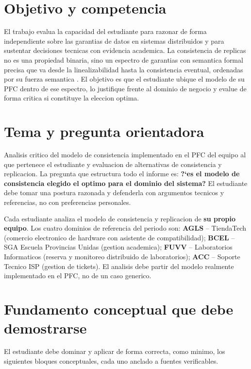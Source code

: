 \documentclass[11pt,a4paper]{article}
\newcommand{\uteqbox}[2]{%
    \begin{tcolorbox}[colback=uteqSoft,colframe=uteqBlue,boxrule=0.8pt,arc=2pt,left=6pt,right=6pt,top=5pt,bottom=5pt,title=#1,fonttitle=\bfseries]
        #2
    \end{tcolorbox}%
}
\begin{document}
\section{Objetivo y competencia}
El trabajo evalua la capacidad del estudiante para razonar de forma independiente sobre las garantias de datos en sistemas distribuidos y para sustentar decisiones tecnicas con evidencia academica. La consistencia de replicas no es una propiedad binaria, sino un espectro de garantias con semantica formal precisa que va desde la linealizabilidad hasta la consistencia eventual, ordenadas por su fuerza semantica \parencite{ViottiVukolic2016Consistency}. El objetivo es que el estudiante ubique el modelo de su PFC dentro de ese espectro, lo justifique frente al dominio de negocio y evalue de forma critica si constituye la eleccion optima.

\section{Tema y pregunta orientadora}
Analisis critico del modelo de consistencia implementado en el PFC del equipo al que pertenece el estudiante y evaluacion de alternativas de consistencia y replicacion. La pregunta que estructura todo el informe es: \textbf{?`es el modelo de consistencia elegido el optimo para el dominio del sistema?} El estudiante debe tomar una postura razonada y defenderla con argumentos tecnicos y referencias, no con preferencias personales.

\uteqbox{Objeto de analisis segun el equipo PFC}{%
Cada estudiante analiza el modelo de consistencia y replicacion de \textbf{su propio equipo}. Los cuatro dominios de referencia del periodo son: \textbf{AGLS} -- TiendaTech (comercio electronico de hardware con asistente de compatibilidad); \textbf{BCEL} -- SGA Escuela Provincias Unidas (gestion academica); \textbf{FUVV} -- Laboratorios Informaticos (reserva y monitoreo distribuido de laboratorios); \textbf{ACC} -- Soporte Tecnico ISP (gestion de tickets). El analisis debe partir del modelo realmente implementado en el PFC, no de un caso generico.%
}

\section{Fundamento conceptual que debe demostrarse}
El estudiante debe dominar y aplicar de forma correcta, como minimo, los siguientes bloques conceptuales, cada uno anclado a fuentes verificables.
\end{document}
